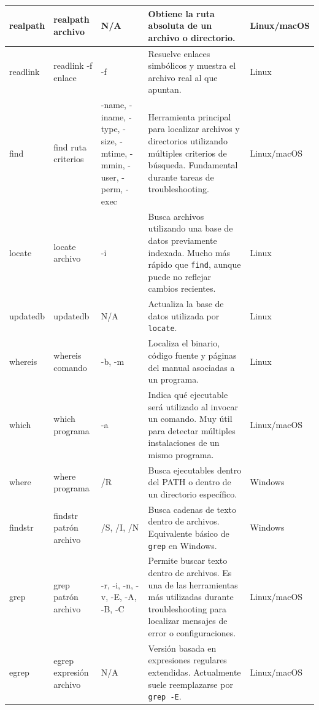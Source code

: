 \documentclass[a4paper,10pt]{article}
\begin{document}
\begin{longtable}{|p{2.8cm}|p{3cm}|p{4cm}|p{5.6cm}|p{1.5cm}|}
realpath &
realpath archivo &
N/A &
Obtiene la ruta absoluta de un archivo o directorio. &
Linux/macOS
\\
\hline

readlink &
readlink -f enlace &
-f &
Resuelve enlaces simbólicos y muestra el archivo real al que apuntan. &
Linux
\\
\hline


find &
find ruta criterios &
-name, -iname, -type, -size, -mtime, -mmin, -user, -perm, -exec &
Herramienta principal para localizar archivos y directorios utilizando múltiples criterios de búsqueda. Fundamental durante tareas de troubleshooting. &
Linux/macOS
\\
\hline

locate &
locate archivo &
-i &
Busca archivos utilizando una base de datos previamente indexada. Mucho más rápido que \texttt{find}, aunque puede no reflejar cambios recientes. &
Linux
\\
\hline

updatedb &
updatedb &
N/A &
Actualiza la base de datos utilizada por \texttt{locate}. &
Linux
\\
\hline

whereis &
whereis comando &
-b, -m &
Localiza el binario, código fuente y páginas del manual asociadas a un programa. &
Linux
\\
\hline

which &
which programa &
-a &
Indica qué ejecutable será utilizado al invocar un comando. Muy útil para detectar múltiples instalaciones de un mismo programa. &
Linux/macOS
\\
\hline

where &
where programa &
/R &
Busca ejecutables dentro del PATH o dentro de un directorio específico. &
Windows
\\
\hline

findstr &
findstr patrón archivo &
/S, /I, /N &
Busca cadenas de texto dentro de archivos. Equivalente básico de \texttt{grep} en Windows. &
Windows
\\
\hline

grep &
grep patrón archivo &
-r, -i, -n, -v, -E, -A, -B, -C &
Permite buscar texto dentro de archivos. Es una de las herramientas más utilizadas durante troubleshooting para localizar mensajes de error o configuraciones. &
Linux/macOS
\\
\hline

egrep &
egrep expresión archivo &
N/A &
Versión basada en expresiones regulares extendidas. Actualmente suele reemplazarse por \texttt{grep -E}. &
Linux/macOS
\\
\hline


\end{longtable}
\end{document}
